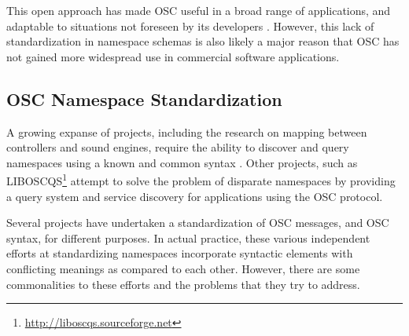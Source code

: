 \documentclass{NIME-alternate}
\begin{document}
\begin{Abstract}
%

This open approach has made OSC useful in a broad range of applications, and adaptable to situations not foreseen by its developers \cite{Wright:2005}.  However, this lack of standardization in namespace schemas is also likely a major reason that OSC has not gained more widespread use in commercial software applications.



\subsection{OSC Namespace Standardization}

A growing expanse of projects, including the research on mapping between controllers and sound engines, require the ability to discover and query namespaces using a known and common syntax \cite{Malloch:2007}. Other projects, such as LIBOSCQS\footnote{\url{http://liboscqs.sourceforge.net}} attempt to solve the problem of disparate namespaces by providing a query system and service discovery for applications using the OSC protocol\cite{Habets:2005}\cite{Schmeder:2004oscqs}.



Several projects have undertaken a standardization of OSC messages, and OSC syntax, for different purposes. In actual practice, these various independent efforts at standardizing namespaces incorporate syntactic elements with conflicting meanings as compared to each other. However, there are some commonalities to these efforts and the problems that they try to address.


\end{Abstract}
\end{document}
